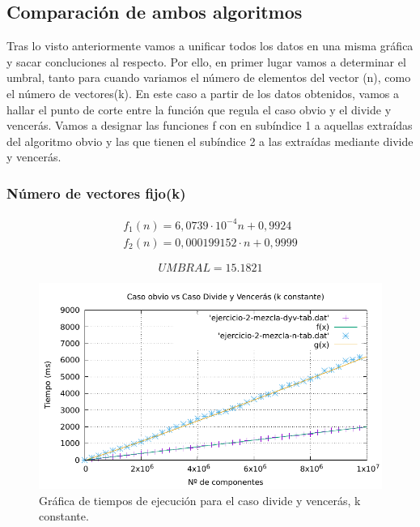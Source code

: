\subsection{Comparación de ambos algoritmos}

Tras lo visto anteriormente vamos a unificar todos los datos en una misma gráfica y sacar concluciones al respecto. Por ello, en primer lugar vamos a determinar el umbral,
tanto para cuando variamos el número de elementos del vector (n), como el número de vectores(k). 
En este caso a partir de los datos obtenidos, vamos a hallar el punto de corte entre
la función que regula el caso obvio y el divide y vencerás. 
Vamos a designar las funciones f con en subíndice 1 a aquellas extraídas del algoritmo obvio y las que tienen el subíndice 2 a las extraídas mediante
divide y vencerás.

\subsubsection{Número de vectores fijo(k)}

\begin{eqnarray}
    f_1(n) = 6,0739 \cdot 10 ^{-4}  n + 0,9924 \\
    f_2(n) = 0,000199152 \cdot n + 0,9999
\end{eqnarray} 

\begin{equation}
   \boxed{UMBRAL = 15.1821}
\end{equation}

\begin{figure}[h]
    \centering
    \includegraphics[scale=0.76]{img/2-umbral-n.pdf}
    \caption{Gráfica de tiempos de ejecución para el caso divide y vencerás, k constante.}
\end{figure}

